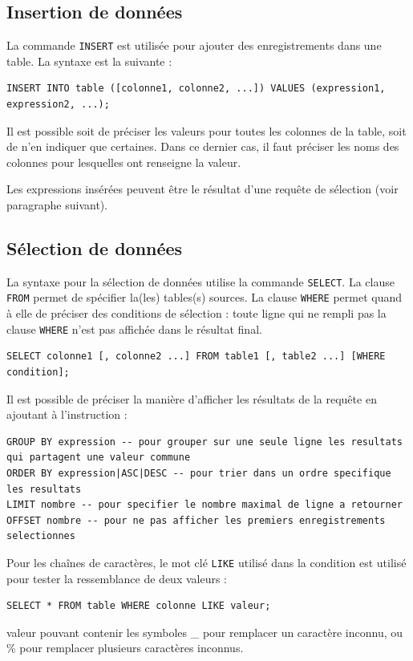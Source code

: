 \documentclass[11pt]{article}
\begin{document}
			
			
			\subsection{Insertion de données}
				La commande \lstinline{INSERT} est utilisée pour ajouter des enregistrements dans une table. La syntaxe est la suivante :
				\begin{lstlisting}
INSERT INTO table ([colonne1, colonne2, ...]) VALUES (expression1, expression2, ...);
				\end{lstlisting}
				
				Il est possible soit de préciser les valeurs pour toutes les colonnes de la table, soit de n'en indiquer que certaines. Dans ce dernier cas, il faut préciser les noms des colonnes pour lesquelles ont renseigne la valeur.
				
				Les expressions insérées peuvent être le résultat d'une requête de sélection (voir paragraphe suivant).
				
			
			\subsection{Sélection de données}
				La syntaxe pour la sélection de données utilise la commande \lstinline{SELECT}. La clause \lstinline{FROM} permet de spécifier la(les) tables(s) sources. La clause \lstinline{WHERE} permet quand à elle de préciser des conditions de sélection : toute ligne qui ne rempli pas la clause \lstinline{WHERE} n'est pas affichée dans le résultat final.
				\begin{lstlisting}
SELECT colonne1 [, colonne2 ...] FROM table1 [, table2 ...] [WHERE condition];
				\end{lstlisting}
				
				Il est possible de préciser la manière d'afficher les résultats de la requête en ajoutant à l'instruction :
				\begin{lstlisting}
GROUP BY expression -- pour grouper sur une seule ligne les resultats qui partagent une valeur commune
ORDER BY expression|ASC|DESC -- pour trier dans un ordre specifique les resultats
LIMIT nombre -- pour specifier le nombre maximal de ligne a retourner
OFFSET nombre -- pour ne pas afficher les premiers enregistrements selectionnes
				\end{lstlisting}
				
				Pour les chaînes de caractères, le mot clé \lstinline{LIKE} utilisé dans la condition est utilisé pour tester la ressemblance de deux valeurs : 
				\begin{lstlisting}
SELECT * FROM table WHERE colonne LIKE valeur;				
				\end{lstlisting}
				valeur pouvant contenir les symboles \_ pour remplacer un caractère inconnu, ou \% pour remplacer plusieurs caractères inconnus.
				
\end{document}
